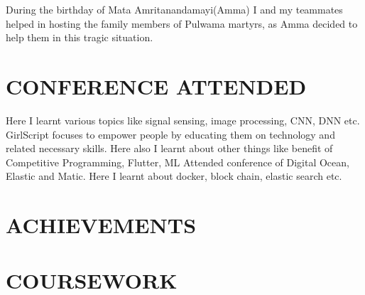 \documentclass[11pt,a4paper,sans]{moderncv}        %
\begin{document}
{During the birthday of Mata Amritanandamayi(Amma) I and my teammates helped in hosting the family members of Pulwama martyrs, as Amma decided to help them in this tragic situation.  }


\section{CONFERENCE ATTENDED}
{Here I learnt various topics like signal sensing, image processing, CNN, DNN etc.}
{GirlScript focuses to empower people by educating them on technology and related necessary skills. Here also I learnt about other things like benefit of Competitive Programming, Flutter, ML}
{Attended conference of Digital Ocean, Elastic and Matic. Here I learnt about docker, block chain, elastic search etc. }

\section{ACHIEVEMENTS}

\section{COURSEWORK}
\end{document}
